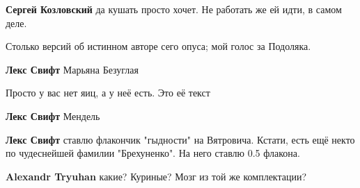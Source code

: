 \begin{itemize}
\begin{itemize}
\textbf{Сергей Козловский} да кушать просто хочет. Не работать же ей идти, в самом деле.
\end{itemize}

 
Столько версий об истинном авторе сего опуса; мой голос за Подоляка.

\begin{itemize}
 
\textbf{Лекс Свифт} Марьяна Безуглая

 
Просто у вас нет яиц, а у неё есть. Это её текст

 
\textbf{Лекс Свифт} Мендель

 
\textbf{Лекс Свифт} ставлю флакончик "гыдности" на Вятровича. Кстати, есть ещё некто по чудеснейшей фамилии "Брехуненко". На него ставлю 0.5 флакона.

 
\textbf{Alexandr Tryuhan} какие? Куриные? Мозг из той же комплектации?

 

\end{itemize}
\end{itemize}
